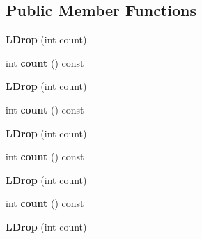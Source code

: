 \subsection*{Public Member Functions}
\begin{DoxyCompactItemize}
\item 
{\bfseries L\+Drop} (int count)\hypertarget{classv8_1_1internal_1_1_l_drop_a1b08788a69eac2ea641700247a6769e2}{}\label{classv8_1_1internal_1_1_l_drop_a1b08788a69eac2ea641700247a6769e2}

\item 
int {\bfseries count} () const \hypertarget{classv8_1_1internal_1_1_l_drop_af2abac6c8563033b3d5b88c29f3ecee4}{}\label{classv8_1_1internal_1_1_l_drop_af2abac6c8563033b3d5b88c29f3ecee4}

\item 
{\bfseries L\+Drop} (int count)\hypertarget{classv8_1_1internal_1_1_l_drop_a1b08788a69eac2ea641700247a6769e2}{}\label{classv8_1_1internal_1_1_l_drop_a1b08788a69eac2ea641700247a6769e2}

\item 
int {\bfseries count} () const \hypertarget{classv8_1_1internal_1_1_l_drop_af2abac6c8563033b3d5b88c29f3ecee4}{}\label{classv8_1_1internal_1_1_l_drop_af2abac6c8563033b3d5b88c29f3ecee4}

\item 
{\bfseries L\+Drop} (int count)\hypertarget{classv8_1_1internal_1_1_l_drop_a1b08788a69eac2ea641700247a6769e2}{}\label{classv8_1_1internal_1_1_l_drop_a1b08788a69eac2ea641700247a6769e2}

\item 
int {\bfseries count} () const \hypertarget{classv8_1_1internal_1_1_l_drop_af2abac6c8563033b3d5b88c29f3ecee4}{}\label{classv8_1_1internal_1_1_l_drop_af2abac6c8563033b3d5b88c29f3ecee4}

\item 
{\bfseries L\+Drop} (int count)\hypertarget{classv8_1_1internal_1_1_l_drop_a1b08788a69eac2ea641700247a6769e2}{}\label{classv8_1_1internal_1_1_l_drop_a1b08788a69eac2ea641700247a6769e2}

\item 
int {\bfseries count} () const \hypertarget{classv8_1_1internal_1_1_l_drop_af2abac6c8563033b3d5b88c29f3ecee4}{}\label{classv8_1_1internal_1_1_l_drop_af2abac6c8563033b3d5b88c29f3ecee4}

\item 
{\bfseries L\+Drop} (int count)\hypertarget{classv8_1_1internal_1_1_l_drop_a1b08788a69eac2ea641700247a6769e2}{}\label{classv8_1_1internal_1_1_l_drop_a1b08788a69eac2ea641700247a6769e2}


\end{DoxyCompactItemize}

